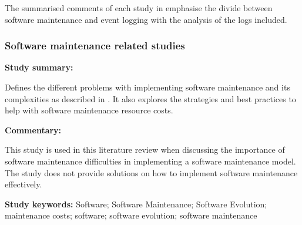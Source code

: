 The summarised comments of each study in  emphasise the divide between software maintenance and event logging with the analysis of the logs included.

\clearpage
\subsubsection{Software maintenance related studies}

\begin{tcolorbox}[colback=gray!5!white, colframe=deepblue!80!black, title=On the Relationship between Software Complexity and Maintenance Costs\cite{Ogheneovo2014}]
	\begin{minipage}[t]{0.25\textwidth}
		\textbf{Study summary:}
	\end{minipage}
	\hfill
	\begin{minipage}[t]{0.65\textwidth}
		Defines the different problems with implementing software maintenance and its complexities as described in . It also explores the strategies and best practices to help with software maintenance resource costs.
	\end{minipage}

	\vspace{0.75em} 

	\begin{minipage}[t]{0.25\textwidth}
		\textbf{Commentary:}
	\end{minipage}
	\hfill
	\begin{minipage}[t]{0.65\textwidth}
		This study is used in this literature review when discussing the importance of software maintenance difficulties in implementing a software maintenance model. The study does not provide solutions on how to implement software maintenance effectively.
	\end{minipage}
	\tcblower
	\textbf{Study keywords:} Software; Software Maintenance; Software Evolution; maintenance costs; software; software evolution; software maintenance
\end{tcolorbox}

